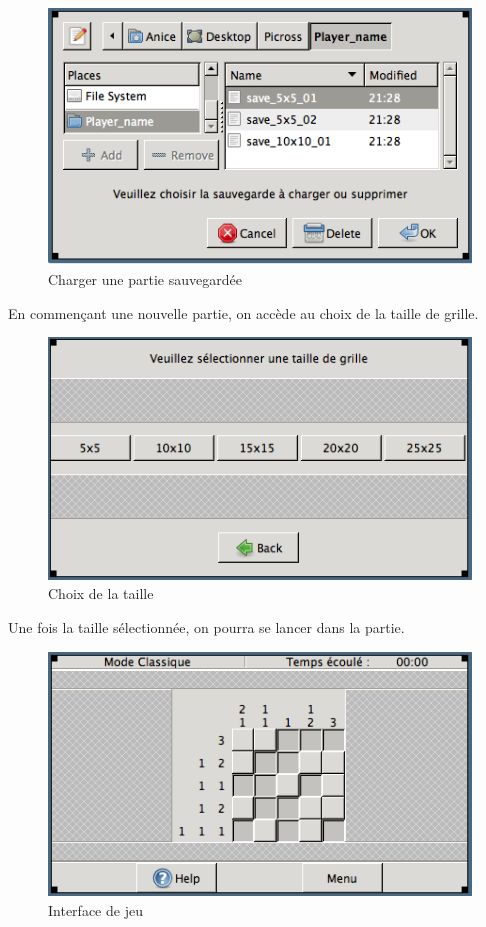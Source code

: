 \documentclass[11pt]{article}
\begin{document}
		\begin{figure}[!ht]
			\centering
			\includegraphics{./IHM/charger_supprimer.png}
			\caption{Charger une partie sauvegardée}
		\end{figure}
	
	\FloatBarrier
	
	En commençant une nouvelle partie, on accède au choix de la taille de grille.
	
		\begin{figure}[!ht]
			\centering
			\includegraphics{./IHM/taille.png}
			\caption{Choix de la taille}
		\end{figure}
		
	\FloatBarrier
	
	Une fois la taille sélectionnée, on pourra se lancer dans la partie.
	
		\begin{figure}[!ht]
			\centering
			\includegraphics{./IHM/jeu.png}
			\caption{Interface de jeu}
		\end{figure}
		
\end{document}
